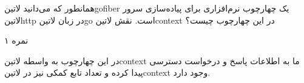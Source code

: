 
همانطور که می‌دانید ‌لاتین{gofiber} یک چهارچوب نرم‌افزاری برای پیاده‌سازی سرور ‌لاتین{http} در زبان ‌لاتین{go} است.
نقش ‌لاتین{context} در این چهارچوب چیست؟

۱ نمره


در این چهارچوب به واسطه ‌لاتین{context} ما به اطلاعات پاسخ و درخواست دسترسی پیدا کرده و تعداد تابع کمکی نیز در ‌لاتین{context} وجود دارد.

